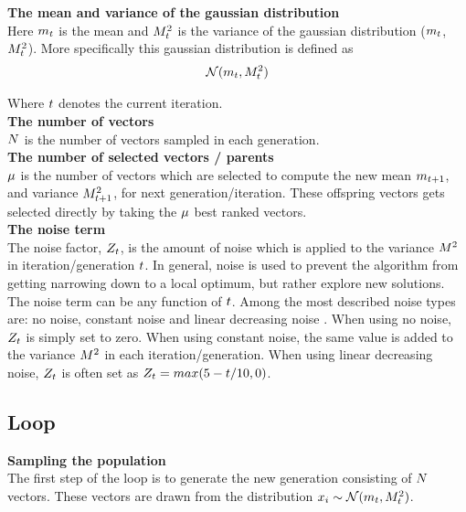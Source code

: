 \textbf{The mean and variance of the gaussian distribution} \\
Here $m_{t}$ is the mean and  
$M^2_{t}$ is the variance 
of the gaussian distribution ($m_{t}$,
$M^2_{t}$). 
More specifically this gaussian distribution is defined as 
\begin{align*}
\mathcal{N}(m_{t},M^2_{t})
\end{align*}

Where $t$ denotes the current iteration.\\


\textbf{The number of vectors}\\
$N$ is the number of vectors sampled in each generation.
\\

\textbf{The number of selected vectors / parents}\\
$\mu$ is the number of vectors which are selected to compute 
the new mean $m_{t + 1}$, and variance
$M^2_{t + 1}$, for next generation/iteration. 
These offspring vectors gets selected 
directly by taking the $\mu$ best ranked
vectors.
\\

\textbf{The noise term}\\
The noise factor, $Z_{t}$, 
is the amount of noise which 
is applied to the variance $M^2$ in
iteration/generation 
$t$. In general, noise is used to prevent
the algorithm from 
getting narrowing down to a local optimum, but
rather explore new solutions.
The noise term can be any
function of $t$. Among 
the most described noise types are: no noise, constant noise 
and linear decreasing noise \citep{szita:06}. 
When using no noise, $Z_{t}$ 
is simply set to zero. When using constant noise, 
the same value is 
added to the variance $M^2$ 
in each iteration/generation. 
When using linear decreasing noise, 
$Z_{t}$ is often set as
$Z_{t}=max(5- t /10,0)$.
\\

\subsection{Loop}

\textbf{Sampling the population}\\
The first step of the loop is to generate the new generation 
consisting of $N$ vectors. 
These vectors are drawn from the distribution 
$x_{i}\sim \mathcal{N}(m_{t},M^2_{t})$.
\\

